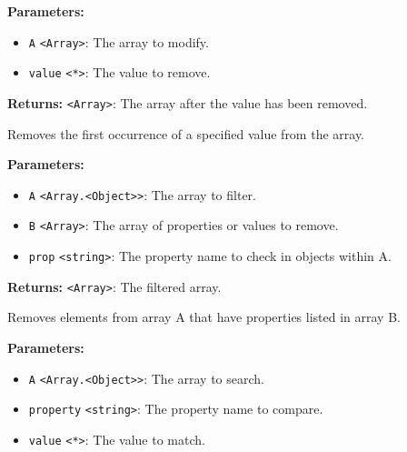 \documentclass[12pt,a4paper]{article}
\begin{document}
\vspace{5mm}
\noindent {}


\noindent \textbf{Parameters:}
\begin{itemize}
  \item \texttt{A} \texttt{<Array>}: The array to modify.
  \item \texttt{value} \texttt{<*>}: The value to remove.
\end{itemize}

\noindent \textbf{Returns:} \texttt{<Array>}: The array after the value has been removed.

\noindent Removes the first occurrence of a specified value from the array.

\vspace{5mm}
\noindent {}


\noindent \textbf{Parameters:}
\begin{itemize}
  \item \texttt{A} \texttt{<Array.<Object>>}: The array to filter.
  \item \texttt{B} \texttt{<Array>}: The array of properties or values to remove.
  \item \texttt{prop} \texttt{<string>}: The property name to check in objects within A.
\end{itemize}

\noindent \textbf{Returns:} \texttt{<Array>}: The filtered array.

\noindent Removes elements from array A that have properties listed in array B.

\vspace{5mm}
\noindent {}


\noindent \textbf{Parameters:}
\begin{itemize}
  \item \texttt{A} \texttt{<Array.<Object>>}: The array to search.
  \item \texttt{property} \texttt{<string>}: The property name to compare.
  \item \texttt{value} \texttt{<*>}: The value to match.
\end{itemize}
\end{document}
